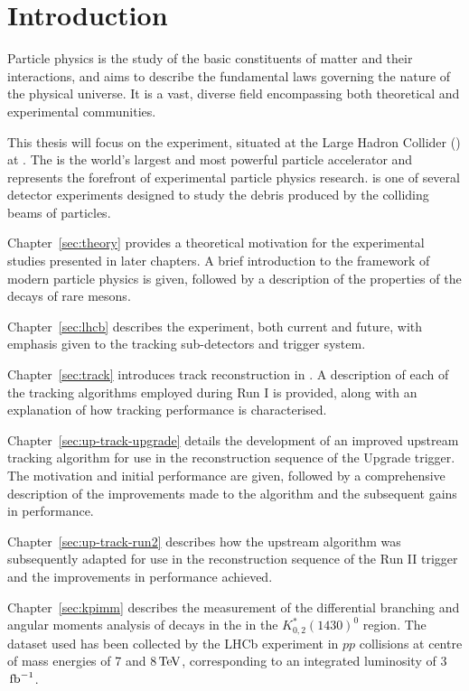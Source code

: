 \section{Introduction}
\label{sec:intro}

Particle physics is the study of the basic constituents of matter and their interactions, and aims to describe the fundamental laws governing the nature of the physical universe. It is a vast, diverse field encompassing both theoretical and experimental communities.

This thesis will focus on the \lhcb experiment, situated at the Large Hadron Collider (\lhc) at \cern. The \lhc is the world's largest and most powerful particle accelerator and represents the forefront of experimental particle physics research. \lhcb is one of several detector experiments designed to study the debris produced by the colliding beams of particles.

Chapter~\ref{sec:theory} provides a theoretical motivation for the experimental studies presented in later chapters. A brief introduction to the framework of modern particle physics is given, followed by a description of the properties of the decays of rare \B mesons.

Chapter~\ref{sec:lhcb} describes the \lhcb experiment, both current and future, with emphasis given to the tracking sub-detectors and trigger system.

Chapter~\ref{sec:track} introduces track reconstruction in \lhcb. A description of each of the tracking algorithms employed during \lhcb Run I is provided, along with an explanation of how tracking performance is characterised.

Chapter~\ref{sec:up-track-upgrade} details the development of an improved upstream tracking algorithm for use in the reconstruction sequence of the \lhcb Upgrade trigger. The motivation and initial performance are given, followed by a comprehensive description of the improvements made to the algorithm and the subsequent gains in performance. 

Chapter~\ref{sec:up-track-run2} describes how the upstream algorithm was subsequently adapted for use in the reconstruction sequence of the \lhcb Run II trigger and the improvements in performance achieved.

Chapter~\ref{sec:kpimm} describes the measurement of the differential branching and angular moments analysis of \BdToKpimm decays in the in the $K^{*}_{0,2}(1430)^{0}$ region. The dataset used has been collected by the LHCb experiment in $pp$ collisions at centre of mass energies of 7 and 8${\mathrm{\,Te\kern -0.1em V}}$, corresponding to an integrated luminosity of 3$\mbox{\,fb}^{-1}$.